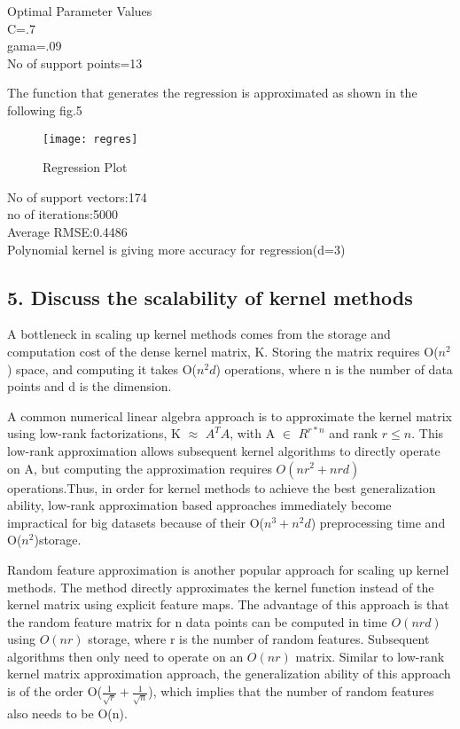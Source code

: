 \documentclass{article}
\begin{document}
Optimal Parameter Values\\
C=.7\\
gama=.09\\
No of support points=13

The function that generates the regression is approximated as shown in the following fig.5
\begin{figure}[h]
  \texttt{[image: regres]}
  \caption{Regression Plot}
\end{figure}

No of support vectors:174\\
no of iterations:5000\\
Average RMSE:0.4486\\
Polynomial kernel is giving more accuracy for regression(d=3)\\


\subsection{5. Discuss the scalability of kernel methods}
A bottleneck in scaling up kernel methods comes from the storage and computation cost of the dense kernel matrix, K. Storing the matrix requires O($n^2$) space, and computing it takes O($n^2d$) operations, where n is the number of data points and d is the dimension. 

A common numerical linear algebra approach is to approximate the kernel matrix using low-rank factorizations, K $\approx$ $A^TA$, with A $\in$ $R^{r*n}$ and rank $r\leq n$. This low-rank approximation allows subsequent kernel algorithms to directly operate on A, but computing the approximation requires $O(nr^2 + nrd)$ operations.Thus, in order for kernel methods to achieve the best generalization ability, low-rank approximation based approaches immediately become impractical for big datasets because of their O($n^3+n^2d$) preprocessing time and O($n^2$)storage\cite{ananth}.

Random feature approximation is another popular approach for scaling up kernel methods. The method directly approximates the kernel function instead of the kernel matrix using explicit feature maps. The advantage of this approach is that the random feature matrix for n data points can be computed in time $O(nrd)$ using $O(nr)$ storage, where r is the number of random features. Subsequent algorithms then only need to operate on an $O(nr)$ matrix. Similar to low-rank kernel matrix approximation approach, the generalization ability of this approach is of the order O($\frac{1}{\sqrt{r}}+\frac{1}{\sqrt{n}}$), which implies that the number of random features also needs to be O(n)\cite{ananth}.
\end{document}

